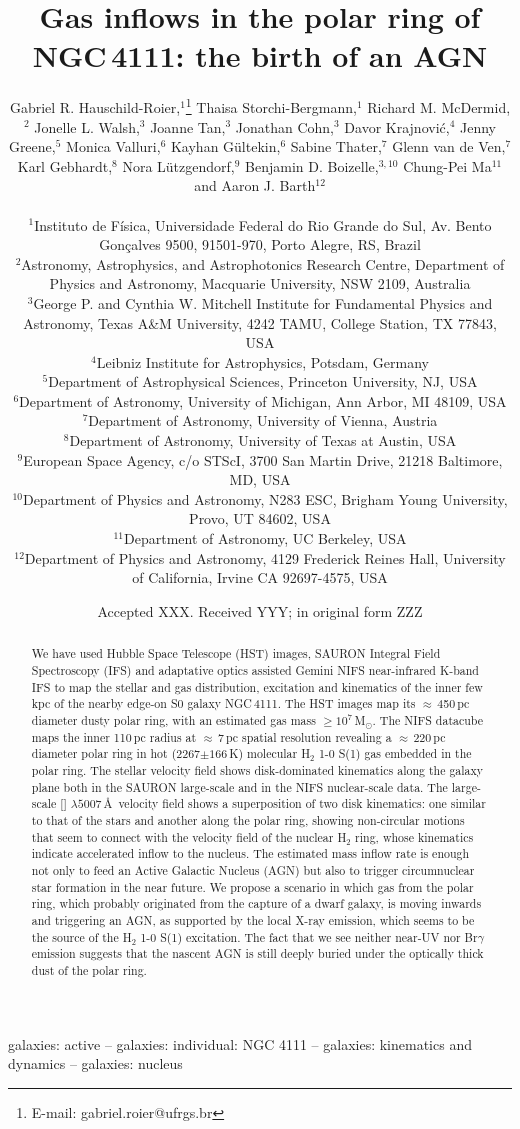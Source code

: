 \documentclass[fleqn,usenatbib]{mnras}
\title[Gas inflows in the polar ring of NGC\,4111]{Gas inflows in the polar ring of NGC\,4111: the birth of an AGN}
\author[Hauschild-Roier et al.]{
Gabriel R. Hauschild-Roier,$^{1}$\thanks{E-mail: gabriel.roier@ufrgs.br}
Thaisa Storchi-Bergmann,$^{1}$
Richard M. McDermid,$^{2}$
\newauthor
Jonelle L. Walsh,$^{3}$
Joanne Tan,$^{3}$
Jonathan Cohn,$^{3}$
Davor Krajnović,$^{4}$
Jenny Greene,$^{5}$
\newauthor
Monica Valluri,$^{6}$
Kayhan Gültekin,$^{6}$
Sabine Thater,$^{7}$
Glenn van de Ven,$^{7}$
Karl Gebhardt,$^{8}$
\newauthor
Nora Lützgendorf,$^{9}$
Benjamin D. Boizelle,$^{3, 10}$
Chung-Pei Ma$^{11}$
and Aaron J. Barth$^{12}$
\\
\\
$^{1}$Instituto de Física, Universidade Federal do Rio Grande do Sul, Av. Bento Gonçalves 9500, 91501-970, Porto Alegre, RS, Brazil\\
$^{2}$Astronomy, Astrophysics, and Astrophotonics Research Centre, Department of Physics and Astronomy, Macquarie University, NSW 2109, Australia\\
$^{3}$George P. and Cynthia W. Mitchell Institute for Fundamental Physics and Astronomy, Texas A\&M University, 4242 TAMU, College Station, TX 77843, USA\\
$^{4}$Leibniz Institute for Astrophysics, Potsdam, Germany\\
$^{5}$Department of Astrophysical Sciences, Princeton University, NJ, USA\\
$^{6}$Department of Astronomy, University of Michigan, Ann Arbor, MI 48109, USA\\
$^{7}$Department of Astronomy, University of Vienna, Austria\\
$^{8}$Department of Astronomy, University of Texas at Austin, USA\\
$^{9}$European Space Agency, c/o STScI, 3700 San Martin Drive, 21218 Baltimore, MD, USA\\
$^{10}$Department of Physics and Astronomy, N283 ESC, Brigham Young University, Provo, UT 84602, USA\\
$^{11}$Department of Astronomy, UC Berkeley, USA\\
$^{12}$Department of Physics and Astronomy, 4129 Frederick Reines Hall, University of California, Irvine CA 92697-4575, USA\\
}
\date{Accepted XXX. Received YYY; in original form ZZZ}
\begin{document}
\label{firstpage}
\pagerange{\pageref{firstpage}--\pageref{lastpage}}
\maketitle

\begin{abstract}

We have used Hubble Space Telescope (HST) images, SAURON Integral Field Spectroscopy (IFS) and adaptative optics assisted Gemini NIFS near-infrared K-band IFS to map the stellar and gas distribution, excitation and kinematics of the inner few kpc of the nearby edge-on S0 galaxy NGC\,4111. The HST images map its $\approx$\,450\,pc diameter dusty polar ring, with an estimated gas mass $\ge10^7$\,M$_\odot$. The NIFS datacube maps the inner 110\,pc radius at $\approx$\,7\,pc spatial resolution revealing a $\approx$\,220\,pc diameter polar ring in hot (2267$\pm166$\,K) molecular H$_2$ 1-0 S(1) gas embedded in the polar ring. The stellar velocity field shows disk-dominated kinematics along the galaxy plane both in the SAURON large-scale and in the NIFS nuclear-scale data. The large-scale [] $\lambda5007$\,\AA\ velocity field shows a superposition of two disk kinematics: one similar to that of the stars and another along the polar ring, showing non-circular motions that seem to connect with the velocity field of the nuclear H$_2$ ring, whose kinematics indicate accelerated inflow to the nucleus. The estimated mass inflow rate is enough not only to feed an Active Galactic Nucleus (AGN) but also to trigger circumnuclear star formation in the near future. We propose a scenario in which gas from the polar ring, which probably originated from the capture of a dwarf galaxy, is moving inwards and triggering an AGN, as supported by the local X-ray emission, which seems to be the source of the H$_2$ 1-0 S(1) excitation. The fact that we see neither near-UV nor Br$\gamma$ emission suggests that the nascent AGN is still deeply buried under the optically thick dust of the polar ring.

\end{abstract}

\begin{keywords}
galaxies: active -- galaxies: individual: NGC 4111 -- galaxies: kinematics and dynamics -- galaxies: nucleus
\end{keywords}
\end{document}

